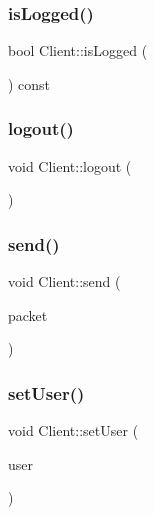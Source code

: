 \subsubsection{\texorpdfstring{is\+Logged()}{isLogged()}}
{\footnotesize\ttfamily bool Client\+::is\+Logged (\begin{DoxyParamCaption}{ }\end{DoxyParamCaption}) const\hspace{0.3cm}{\ttfamily [inline]}}

\mbox{\label{classClient_aa977795294407c10fe843b5bc28b6685}} 
\subsubsection{\texorpdfstring{logout()}{logout()}}
{\footnotesize\ttfamily void Client\+::logout (\begin{DoxyParamCaption}{ }\end{DoxyParamCaption})\hspace{0.3cm}{\ttfamily [inline]}}

\mbox{\label{classClient_ab26edfd53bf1deeab0aac1715858f279}} 
\subsubsection{\texorpdfstring{send()}{send()}}
{\footnotesize\ttfamily void Client\+::send (\begin{DoxyParamCaption}\item[{const I\+Packet \&}]{packet }\end{DoxyParamCaption})\hspace{0.3cm}{\ttfamily [inline]}}

\mbox{\label{classClient_a902b85e55694c497acf50deb082cb23e}} 
\subsubsection{\texorpdfstring{set\+User()}{setUser()}}
{\footnotesize\ttfamily void Client\+::set\+User (\begin{DoxyParamCaption}\item[{const \mbox{\hyperlink{structUser}{User}} \&}]{user }\end{DoxyParamCaption})\hspace{0.3cm}{\ttfamily [inline]}}



